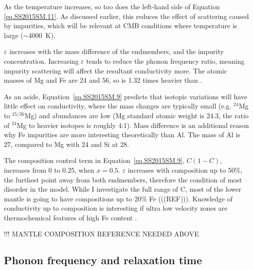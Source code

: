 As the temperature increases, so too does the left-hand side of Equation \ref{eq.SS2015SM.11}. As discussed earlier, this reduces the effect of scattering caused by impurities, which will be relevant at CMB conditions where temperature is large ($\sim$4000~K). 

$\varepsilon$ increases with the mass difference of the endmembers, and the impurity concentration. Increasing $\varepsilon$ tends to reduce the phonon frequency ratio, meaning impurity scattering will affect the resultant conductivity more. The atomic masses of Mg and Fe are 24 and 56, so \fesios is 1.32 times heavier than \mgsio. 

As an aside, Equation~\ref{eq.SS2015SM.9} predicts that isotopic variations will have little effect on conductivity, where the mass changes are typically small (e.g. $^{24}$Mg to $^{25/26}$Mg) and abundances are low (Mg standard atomic weight is 24.3, the ratio of $^{24}$Mg to heavier isotopes is roughly 4:1). Mass difference is an additional reason why Fe impurities are more interesting theoretically than Al. The mass of Al is 27, compared to Mg with 24 and Si at 28.

The composition control term in Equation~\ref{eq.SS2015SM.9}, $C(1-C)$, increases from 0 to 0.25, when $x = 0.5$. $\varepsilon$ increases with composition up to 50\%, the furthest point away from both endmembers, therefore the condition of most disorder in the model. While I investigate the full range of C, most of the lower mantle \mgfesios is going to have compositions up to 20\% Fe (((REF))). Knowledge of conductivity up to \fesios composition is interesting if ultra low velocity zones are thermochemical features of high Fe content \citep[e.g.][]{Mao2004, Dobson2005}. 

!!! MANTLE COMPOSITION REFERENCE NEEDED ABOVE

\subsection{Phonon frequency and relaxation time} 

